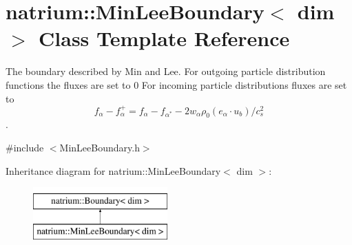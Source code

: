 \hypertarget{classnatrium_1_1MinLeeBoundary}{\section{natrium\-:\-:Min\-Lee\-Boundary$<$ dim $>$ Class Template Reference}
\label{classnatrium_1_1MinLeeBoundary}
}


The boundary described by Min and Lee. For outgoing particle distribution functions the fluxes are set to 0 For incoming particle distributions fluxes are set to \[ f_{\alpha} - f^{+}_{\alpha} = f_{\alpha} - f_{\alpha^{*}} - 2w_{\alpha} \rho_{0} (e_{\alpha}\cdot u_{b})/c^{2}_{s}\].  




{\ttfamily \#include $<$Min\-Lee\-Boundary.\-h$>$}

Inheritance diagram for natrium\-:\-:Min\-Lee\-Boundary$<$ dim $>$\-:\begin{figure}[H]
\begin{center}
\leavevmode
\includegraphics[height=2.000000cm]{classnatrium_1_1MinLeeBoundary}
\end{center}
\end{figure}
